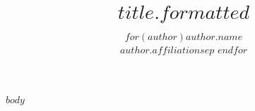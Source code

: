 \documentclass[article]{jss}
\author{
$for(author)$$author.name$\\$author.affiliation$$sep$ \And $endfor$
}
\title{$title.formatted$}
\begin{document}
$body$
\end{document}
